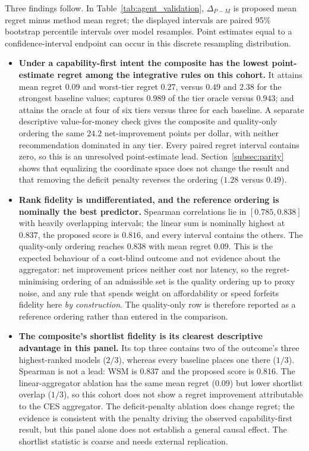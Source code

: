 \documentclass[pdflatex,sn-mathphys-num]{sn-jnl}
\theoremstyle{thmstyleone}
\theoremstyle{thmstylethree}
\begin{document}
Three findings follow. In Table~\ref{tab:agent_validation}, $\Delta_{P-M}$ is proposed mean regret minus method mean regret; the displayed intervals are paired 95\% bootstrap percentile intervals over model resamples. Point estimates equal to a confidence-interval endpoint can occur in this discrete resampling distribution.
\begin{itemize}
  \item \textbf{Under a capability-first intent the composite has the lowest point-estimate regret among the integrative rules on this cohort.} It attains mean regret $0.09$ and worst-tier regret $0.27$, versus $0.49$ and $2.38$ for the strongest baseline values; captures $0.989$ of the tier oracle versus $0.943$; and attains the oracle at four of six tiers versus three for each baseline. A separate descriptive value-for-money check gives the composite and quality-only ordering the same $24.2$ net-improvement points per dollar, with neither recommendation dominated in any tier. Every paired regret interval contains zero, so this is an unresolved point-estimate lead. Section~\ref{subsec:parity} shows that equalizing the coordinate space does not change the result and that removing the deficit penalty reverses the ordering ($1.28$ versus $0.49$).
  \item \textbf{Rank fidelity is undifferentiated, and the reference ordering is nominally the best predictor.} Spearman correlations lie in $[0.785,0.838]$ with heavily overlapping intervals; the linear sum is nominally highest at $0.837$, the proposed score is $0.816$, and every interval contains the others. The quality-only ordering reaches $0.838$ with mean regret $0.09$. This is the expected behaviour of a cost-blind outcome and not evidence about the aggregator: net improvement prices neither cost nor latency, so the regret-minimising ordering of an admissible set is the quality ordering up to proxy noise, and any rule that spends weight on affordability or speed forfeits fidelity here \emph{by construction}. The quality-only row is therefore reported as a reference ordering rather than entered in the comparison.
  \item \textbf{The composite's shortlist fidelity is its clearest descriptive advantage in this panel.} Its top three contains two of the outcome's three highest-ranked models ($2/3$), whereas every baseline places one there ($1/3$). Spearman is not a lead: WSM is $0.837$ and the proposed score is $0.816$. The linear-aggregator ablation has the same mean regret ($0.09$) but lower shortlist overlap ($1/3$), so this cohort does not show a regret improvement attributable to the CES aggregator. The deficit-penalty ablation does change regret; the evidence is consistent with the penalty driving the observed capability-first result, but this panel alone does not establish a general causal effect. The shortlist statistic is coarse and needs external replication.
\end{itemize}
\end{document}
